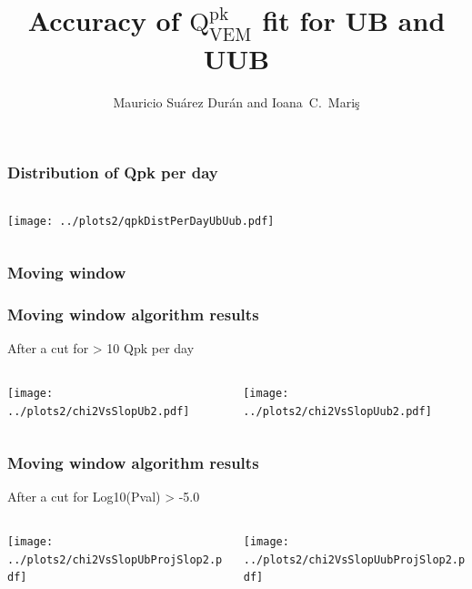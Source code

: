 \documentclass[aspectratio=169]{beamer}
\title{Accuracy of $\mathrm{Q}^{\mathrm{pk}}_{\mathrm{VEM}}$ fit for UB and UUB}
\author{
  Mauricio Su\'arez Dur\'an and Ioana~C.~Mari\c{s}
}
\institute{IIHE-ULB}
\begin{document}
\begin{frame}
  \titlepage
\end{frame}

\begin{frame}
  \frametitle{Distribution of Qpk per day}
  \vspace{0.5cm}
  \begin{columns}
    \begin{column}{1.\textwidth}
      \texttt{[image: ../plots2/qpkDistPerDayUbUub.pdf]}
    \end{column} 
  \end{columns}
\end{frame}


\begin{frame}
  \frametitle{Moving window}
  \begin{center}
  \end{center}
\end{frame}

\begin{frame}
  \frametitle{Moving window algorithm results}
  After a cut for > 10 Qpk per day
  \vspace{0.5cm}
  \begin{columns}
    \begin{column}{0.5\textwidth}
      \texttt{[image: ../plots2/chi2VsSlopUb2.pdf]}
    \end{column}
    \begin{column}{0.5\textwidth}
      \texttt{[image: ../plots2/chi2VsSlopUub2.pdf]}
    \end{column}
  \end{columns}
\end{frame}

\begin{frame}
  \frametitle{Moving window algorithm results}
  After a cut for Log10(Pval) > -5.0
  \vspace{0.5cm}
  \begin{columns}
    \begin{column}{0.5\textwidth}
      \texttt{[image: ../plots2/chi2VsSlopUbProjSlop2.pdf]}
    \end{column}
    \begin{column}{0.5\textwidth}
      \texttt{[image: ../plots2/chi2VsSlopUubProjSlop2.pdf]}
    \end{column}
  \end{columns}
\end{frame}
\end{document}
